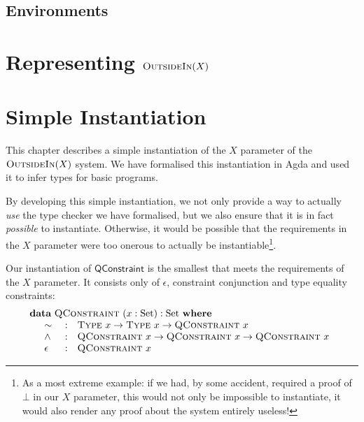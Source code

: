 \documentclass[a4paper]{jfp}
\newcommand{\outsidein}{\textsc{OutsideIn}(X)}
\begin{document}
\subsection{Environments}

\newpage
\section{Representing $\outsidein$}



\newpage
\section{Simple Instantiation}

This chapter describes a simple instantiation of the $X$ parameter of the $\outsidein$ system. We have formalised this instantiation in Agda and used
it to infer types for basic programs.

By developing this simple instantiation, we not only provide a way to actually \emph{use} the type checker we have formalised, but we also ensure that
it is in fact \emph{possible} to instantiate. Otherwise, it would be possible that the requirements in the $X$ parameter were too onerous to actually be
instantiable\footnote{As a most extreme example: if we had, by some accident, required a proof of $\bot$ in our $X$ parameter, this would not only be 
   impossible to instantiate, it would also render any proof about the system entirely useless!}.  

Our instantiation of $\textsf{QConstraint}$ is the smallest that meets the requirements of the $X$ parameter. It consists only of $\epsilon$,
constraint conjunction and type equality constraints:
\begin{displaymath}
   \begin{array}{l}
      \textbf{data}\ \textsc{QConstraint}\ (x : \text{Set}) : \text{Set}\ \textbf{where} \\
      \quad \begin{array}{lll}
      \sim\ & : & \textsc{Type}\ x \rightarrow \textsc{Type}\ x \rightarrow \textsc{QConstraint}\ x \\ 
      \land & : & \textsc{QConstraint}\ x \rightarrow \textsc{QConstraint}\ x \rightarrow \textsc{QConstraint}\ x  \\
      \epsilon\ & : & \textsc{QConstraint}\ x
      \end{array}
   \end{array}
\end{displaymath}
\end{document}
